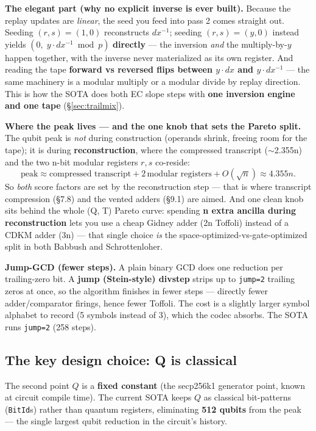 \documentclass[11pt,a4paper]{article}
\begin{document}
\textbf{The elegant part (why no explicit inverse is ever built).} Because the replay updates are
\emph{linear}, the seed you feed into pass 2 comes straight out. Seeding $(r, s) = (1, 0)$
reconstructs $dx^{-1}$; seeding $(r, s) = (y, 0)$ instead yields $(0,\; y\cdot dx^{-1} \bmod p)$
\textbf{directly} --- the inversion \emph{and} the multiply-by-$y$ happen together, with the inverse
never materialized as its own register. And reading the tape \textbf{forward vs reversed flips
between $y\cdot dx$ and $y\cdot dx^{-1}$} --- the same machinery is a modular multiply or a modular
divide by replay direction. This is how the SOTA does both EC slope steps with \textbf{one inversion
engine and one tape} (\S\ref{sec:trailmix}).

\textbf{Where the peak lives --- and the one knob that sets the Pareto split.} The qubit peak is
\emph{not} during construction (operands shrink, freeing room for the tape); it is during
\textbf{reconstruction}, where the compressed transcript ($\sim$2.355n) and the two n-bit modular
registers $r, s$ co-reside:
\[
  \text{peak} \approx \text{compressed transcript} + 2\,\text{modular registers} + O(\sqrt{n})
  \approx 4.355n.
\]
So \emph{both} score factors are set by the reconstruction step --- that is where transcript
compression (\S7.8) and the vented adders (\S9.1) are aimed. And one clean knob sits behind the whole
(Q, T) Pareto curve: spending \textbf{n extra ancilla during reconstruction} lets you use a cheap
Gidney adder (2n Toffoli) instead of a CDKM adder (3n) --- that single choice \emph{is} the
space-optimized-vs-gate-optimized split in both Babbush and Schrottenloher.

\textbf{Jump-GCD (fewer steps).} A plain binary GCD does one reduction per trailing-zero bit. A
\textbf{jump (Stein-style) divstep} strips up to \texttt{jump=2} trailing zeros at once, so the
algorithm finishes in fewer steps --- directly fewer adder/comparator firings, hence fewer Toffoli.
The cost is a slightly larger symbol alphabet to record (5 symbols instead of 3), which the codec
absorbs. The SOTA runs \texttt{jump=2} (258 steps).

\subsection{The key design choice: Q is classical}

The second point $Q$ is a \textbf{fixed constant} (the secp256k1 generator point, known at circuit
compile time). The current SOTA keeps $Q$ as classical bit-patterns (\texttt{BitId}s) rather than
quantum registers, eliminating \textbf{512 qubits} from the peak --- the single largest qubit
reduction in the circuit's history.
\end{document}
